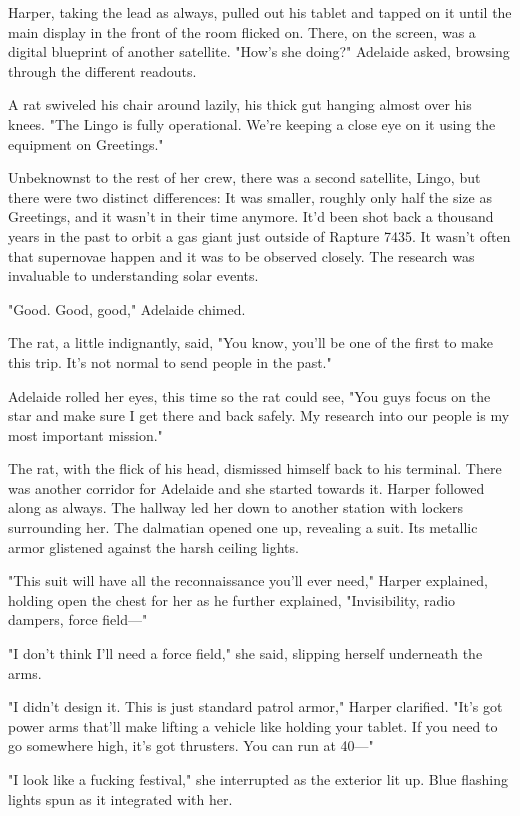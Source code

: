 Harper, taking the lead as always, pulled out his tablet and tapped on it until the main display in the front of the room flicked on. There, on the screen, was a digital blueprint of another satellite. "How's she doing?" Adelaide asked, browsing through the different readouts.

A rat swiveled his chair around lazily, his thick gut hanging almost over his knees. "The Lingo is fully operational. We're keeping a close eye on it using the equipment on Greetings."

Unbeknownst to the rest of her crew, there was a second satellite, Lingo, but there were two distinct differences: It was smaller, roughly only half the size as Greetings, and it wasn't in their time anymore. It'd been shot back a thousand years in the past to orbit a gas giant just outside of Rapture 7435. It wasn't often that supernovae happen and it was to be observed closely. The research was invaluable to understanding solar events.

"Good. Good, good," Adelaide chimed.

The rat, a little indignantly, said, "You know, you'll be one of the first to make this trip. It's not normal to send people in the past."

Adelaide rolled her eyes, this time so the rat could see, "You guys focus on the star and make sure I get there and back safely. My research into our people is my most important mission."

The rat, with the flick of his head, dismissed himself back to his terminal. There was another corridor for Adelaide and she started towards it. Harper followed along as always. The hallway led her down to another station with lockers surrounding her. The dalmatian opened one up, revealing a suit. Its metallic armor glistened against the harsh ceiling lights.

"This suit will have all the reconnaissance you'll ever need," Harper explained, holding open the chest for her as he further explained, "Invisibility, radio dampers, force field---"

"I don't think I'll need a force field," she said, slipping herself underneath the arms.

"I didn't design it. This is just standard patrol armor," Harper clarified. "It's got power arms that'll make lifting a vehicle like holding your tablet. If you need to go somewhere high, it's got thrusters. You can run at 40---"

"I look like a fucking festival," she interrupted as the exterior lit up. Blue flashing lights spun as it integrated with her.

